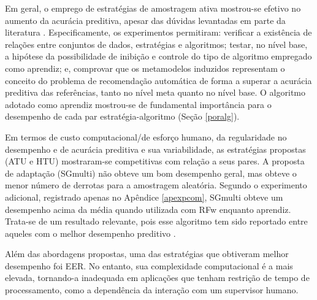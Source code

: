 Em geral, o emprego de estratégias de amostragem ativa mostrou-se efetivo no aumento da acurácia preditiva, apesar das dúvidas levantadas em parte da literatura \cite{journals/corr/EvansAA14a,journals/sigkdd/AttenbergP10}.
Especificamente, os experimentos permitiram: verificar a existência de relações entre conjuntos de dados, estratégias e algoritmos;
testar, no nível base, a hipótese da possibilidade de inibição e controle do tipo de algoritmo empregado como aprendiz;
e, comprovar que os metamodelos induzidos representam o conceito do problema de recomendação automática de forma a superar a acurácia preditiva das referências, tanto no nível meta quanto no nível base.
O algoritmo adotado como aprendiz mostrou-se de fundamental importância para o desempenho de cada par estratégia-algoritmo (Seção \ref{poralg}).

Em termos de custo computacional/de esforço humano, da regularidade no desempenho e de acurácia preditiva e sua variabilidade, as estratégias propostas (ATU e HTU) mostraram-se competitivas com relação a seus pares.
A proposta de adaptação (SGmulti) não obteve um bom desempenho geral, mas obteve o menor número de derrotas para a amostragem aleatória.
Segundo o experimento adicional, registrado apenas no Apêndice \ref{apexpcom}, SGmulti obteve um desempenho acima da média quando utilizada com RFw enquanto aprendiz.
Trata-se de um resultado relevante, pois  esse algoritmo tem sido reportado entre aqueles com o melhor desempenho preditivo \cite{journals/jmlr/DelgadoCBA14}.

Além das abordagens propostas, uma das estratégias que obtiveram melhor desempenho foi EER.
No entanto, sua complexidade computacional é a mais elevada, tornando-a inadequada em aplicações que tenham restrição de tempo de processamento, como a dependência da interação com um supervisor humano.

